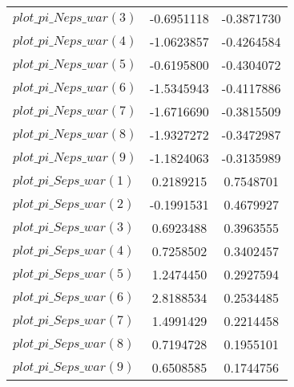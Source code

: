 \begin{center}
\begin{longtable}{lcc}
$plot\_pi\_N eps\_war (3)   $	 & 	     -0.6951118	 & 	     -0.3871730 \\ 
$plot\_pi\_N eps\_war (4)   $	 & 	     -1.0623857	 & 	     -0.4264584 \\ 
$plot\_pi\_N eps\_war (5)   $	 & 	     -0.6195800	 & 	     -0.4304072 \\ 
$plot\_pi\_N eps\_war (6)   $	 & 	     -1.5345943	 & 	     -0.4117886 \\ 
$plot\_pi\_N eps\_war (7)   $	 & 	     -1.6716690	 & 	     -0.3815509 \\ 
$plot\_pi\_N eps\_war (8)   $	 & 	     -1.9327272	 & 	     -0.3472987 \\ 
$plot\_pi\_N eps\_war (9)   $	 & 	     -1.1824063	 & 	     -0.3135989 \\ 
$plot\_pi\_S eps\_war (1)   $	 & 	      0.2189215	 & 	      0.7548701 \\ 
$plot\_pi\_S eps\_war (2)   $	 & 	     -0.1991531	 & 	      0.4679927 \\ 
$plot\_pi\_S eps\_war (3)   $	 & 	      0.6923488	 & 	      0.3963555 \\ 
$plot\_pi\_S eps\_war (4)   $	 & 	      0.7258502	 & 	      0.3402457 \\ 
$plot\_pi\_S eps\_war (5)   $	 & 	      1.2474450	 & 	      0.2927594 \\ 
$plot\_pi\_S eps\_war (6)   $	 & 	      2.8188534	 & 	      0.2534485 \\ 
$plot\_pi\_S eps\_war (7)   $	 & 	      1.4991429	 & 	      0.2214458 \\ 
$plot\_pi\_S eps\_war (8)   $	 & 	      0.7194728	 & 	      0.1955101 \\ 
$plot\_pi\_S eps\_war (9)   $	 & 	      0.6508585	 & 	      0.1744756 \\ 
\end{longtable}
 \end{center}

